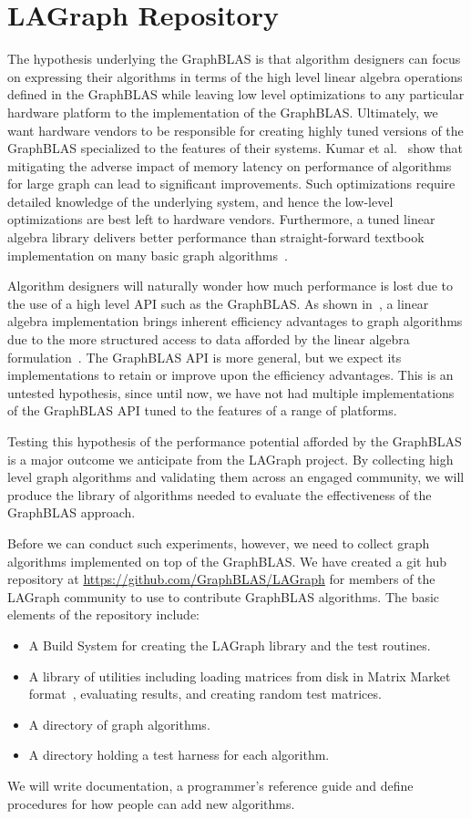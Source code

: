\section{LAGraph Repository}
\label{sec:repo}

The hypothesis underlying the GraphBLAS is that algorithm designers can focus on expressing their algorithms
in terms of the high level linear algebra operations defined in the GraphBLAS while leaving low level
optimizations to any particular hardware platform to the implementation of the GraphBLAS.  Ultimately, 
we want hardware vendors to be responsible for creating highly tuned versions of the GraphBLAS
specialized to the features of their systems.
Kumar et al.~\cite{KuHPEC2016} show that mitigating the adverse impact of memory
latency on performance of algorithms for large graph can lead to significant improvements.
Such optimizations require detailed knowledge of the underlying system, and hence the 
low-level optimizations are best left to hardware vendors.
Furthermore, a tuned linear algebra library delivers
better performance than straight-forward textbook implementation on many basic graph algorithms~\cite{KuJour}.

Algorithm designers will naturally wonder how much performance is lost due to the use of a high 
level API such as the GraphBLAS.  As shown in~\cite{KuJour}, a linear algebra 
implementation brings inherent efficiency advantages to 
graph algorithms due to the more structured access to data afforded by the linear algebra 
formulation~\cite{KuJour}.
The GraphBLAS API is more general, but we expect its implementations to retain or improve upon
the efficiency advantages.
This is an untested hypothesis, since until now, we have not had multiple 
implementations of the GraphBLAS API tuned to the features of a range of platforms.

Testing this hypothesis of the performance potential afforded by the GraphBLAS is a major outcome
we anticipate from the LAGraph project.  By collecting high level graph algorithms and validating them
across an engaged community, we will produce the library of algorithms needed to evaluate the 
effectiveness of the GraphBLAS approach.

Before we can conduct such experiments, however, we need to collect graph algorithms implemented on 
top of the GraphBLAS. We have created a git hub repository at
\url{https://github.com/GraphBLAS/LAGraph} for members of the LAGraph community to 
use to contribute GraphBLAS algorithms. The basic elements of the repository include:
\begin{itemize}
\item A Build System for creating the LAGraph library and the test routines.
\item A library of utilities including loading matrices from disk in Matrix Market format~\cite{MM},
    evaluating results, and creating random test matrices.
\item A directory of graph algorithms.
\item A directory holding a test harness for each algorithm.
\end{itemize}

We will write documentation, a programmer's reference guide and define procedures for how people
can add new algorithms.  
